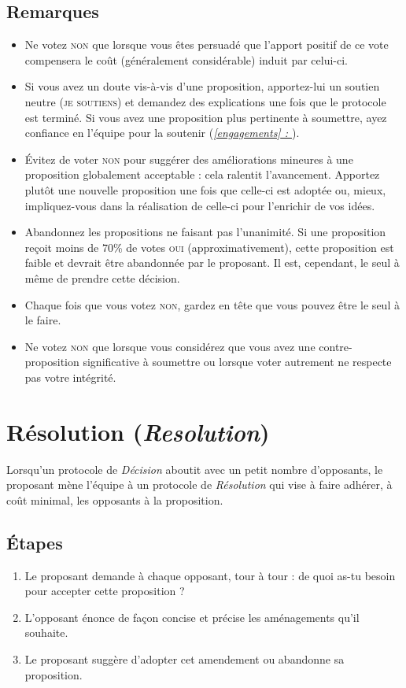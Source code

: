 \documentclass[paper=6in:9in,pagesize=pdftex,headinclude=on,footinclude=on,11pt]{scrbook}
\newcommand*{\fullref}[1]{\textit{\hyperref[{#1}]{\autoref*{#1} : \nameref*{#1}}}}
\let\oldsection\section
\renewcommand\section{\clearpage\oldsection}
\begin{document}
\subsection{Remarques}
\begin{itemize}
	\item Ne votez \textsc{non} que lorsque vous êtes persuadé que l'apport positif de ce vote compensera le coût (généralement considérable) induit par celui-ci.
	\item Si vous avez un doute vis-à-vis d'une proposition, apportez-lui un soutien neutre (\textsc{je soutiens}) et demandez des explications une fois que le
	      protocole est terminé. Si vous avez une proposition plus pertinente à soumettre, ayez confiance en l'équipe pour la soutenir (\fullref{engagements}).
	\item Évitez de voter \textsc{non} pour suggérer des améliorations mineures à une proposition globalement acceptable : cela ralentit l'avancement. Apportez
	      plutôt une nouvelle proposition une fois que celle-ci est adoptée ou, mieux, impliquez-vous dans la réalisation de celle-ci pour l'enrichir de vos idées.
	\item Abandonnez les propositions ne faisant pas l'unanimité. Si une proposition reçoit moins de 70\% de votes \textsc{oui} (approximativement), cette proposition
	      est faible et devrait être abandonnée par le proposant. Il est, cependant, le seul à même de prendre cette décision.
	\item Chaque fois que vous votez \textsc{non}, gardez en tête que vous pouvez être le seul à le faire.
	\item Ne votez \textsc{non} que lorsque vous considérez que vous avez une contre-proposition significative à soumettre ou lorsque voter autrement ne respecte pas
	      votre intégrité.
\end{itemize}

\section{Résolution (\emph{Resolution})} \label{protocole-resolution}

Lorsqu'un protocole de \emph{Décision} aboutit avec un petit nombre d'opposants, le proposant mène l'équipe à un protocole de \emph{Résolution} qui vise à faire adhérer,
à coût minimal, les opposants à la proposition.

\subsection{Étapes}
\begin{enumerate}
	\item Le proposant demande à chaque opposant, tour à tour : \og{}de quoi as-tu besoin pour accepter cette proposition ?\fg{}
	\item L'opposant énonce de façon concise et précise les aménagements qu'il souhaite.
	\item Le proposant suggère d'adopter cet amendement ou abandonne sa proposition.
\end{enumerate}
\end{document}

